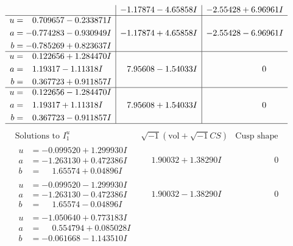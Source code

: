 \documentclass[1p]{elsarticle_modified}
\theoremstyle{definition}
\newcommand{\I}{\sqrt{-1}}
\begin{document}
$$\begin{array}{c|c|c}
 & -1.17874 - 4.65858 I & -2.55428 + 6.96961 I \\ \hline\begin{aligned}
u &= \phantom{-}0.709657 - 0.233871 I \\
a &= -0.774283 - 0.930949 I \\
b &= -0.785269 + 0.823637 I\end{aligned}
 & -1.17874 + 4.65858 I & -2.55428 - 6.96961 I \\ \hline\begin{aligned}
u &= \phantom{-}0.122656 + 1.284470 I \\
a &= \phantom{-}1.19317 - 1.11318 I \\
b &= \phantom{-}0.367723 + 0.911857 I\end{aligned}
 & \phantom{-}7.95608 - 1.54033 I & \phantom{-0.000000 } 0 \\ \hline\begin{aligned}
u &= \phantom{-}0.122656 - 1.284470 I \\
a &= \phantom{-}1.19317 + 1.11318 I \\
b &= \phantom{-}0.367723 - 0.911857 I\end{aligned}
 & \phantom{-}7.95608 + 1.54033 I & \phantom{-0.000000 } 0\\
 \hline 
 \end{array}$$\newpage$$\begin{array}{c|c|c}  
\text{Solutions to }I^u_{1}& \I (\text{vol} + \sqrt{-1}CS) & \text{Cusp shape}\\
 \hline 
\begin{aligned}
u &= -0.099520 + 1.299930 I \\
a &= -1.263130 + 0.472386 I \\
b &= \phantom{-}1.65574 + 0.04896 I\end{aligned}
 & \phantom{-}1.90032 + 1.38290 I & \phantom{-0.000000 } 0 \\ \hline\begin{aligned}
u &= -0.099520 - 1.299930 I \\
a &= -1.263130 - 0.472386 I \\
b &= \phantom{-}1.65574 - 0.04896 I\end{aligned}
 & \phantom{-}1.90032 - 1.38290 I & \phantom{-0.000000 } 0 \\ \hline\begin{aligned}
u &= -1.050640 + 0.773183 I \\
a &= \phantom{-}0.554794 + 0.085028 I \\
b &= -0.061668 - 1.143510 I\end{aligned}

\end{array}$$
\end{document}
